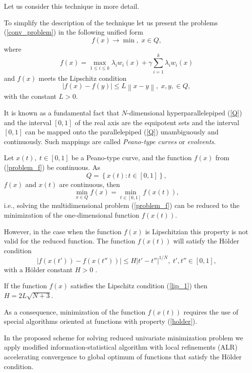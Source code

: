 \documentclass[]{interact}
\theoremstyle{plain}%
\theoremstyle{definition}
\theoremstyle{remark}
\begin{document}
Let us consider this technique in more detail.

To simplify the description of the technique let us present the problems (\ref{conv_problem}) in the following unified form
\begin{equation}\label{problem_f}
f(x) \rightarrow \min, \; x \in Q,
\end{equation}
where 
\[
f(x) = \max_{1 \leq i \leq k}{\lambda_i w_i(x)} + \gamma \sum_{i=1}^k{\lambda_i w_i(x)}
\]
and $f(x)$ meets the Lipschitz condition 
\begin{equation}\label{lip_1}
\left| f(x) - f(y)\right| \leq L \left\| x-y \right\|, \; x,y, \in Q,
\end{equation}
with the constant $L>0$.

It is known as a fundamental fact that $N$-dimensional hyperparallelepiped (\ref{Q}) and the interval $[0,1]$ of the real axis are the equipotent sets and the interval $[0,1]$ can be mapped onto the parallelepiped (\ref{Q}) unambiguously and continuously. Such mappings are called \textit{Peano-type curves} or \textit{evolvents}.


Let $x(t), \; t \in [0,1]$  be a Peano-type curve, and the function  $f(x)$ from (\ref{problem_f}) be continuous. As
\[
Q =\left\{x(t) : t \in [0,1]\right\},
\]
$f(x)$ and $x(t)$ are continuous, then
\[
\min_{x \in Q} f(x) = \min_{t \in [0,1]}f(x(t)),
\]
i.e., solving the multidimensional problem (\ref{problem_f}) can be reduced to the minimization of the one-dimensional function $f(x(t))$.

However, in the case when the function $f(x)$ is Lipschitzian this property is not valid for the reduced function. The function $f(x(t))$ will satisfy the H{\"o}lder condition
\begin{equation}\label{holder}
\left|f(x(t'))-f(x(t''))\right| \leq H \left|t'-t''\right|^{1/N}, \; t',t'' \in [0,1],
\end{equation}
with a H{\"o}lder constant $H>0$ \cite{Strongin2000,Sergeyev2013}.

If the function $f(x)$ satisfies the Lipschitz condition (\ref{lip_1}) then $H=2L\sqrt{N+3}$.

As a consequence, minimization of the function $f(x(t))$  requires the use of special algorithms oriented at functions with property (\ref{holder}).

In the proposed scheme for solving reduced univariate minimization problem we apply modified information-statistical algorithm \cite{Strongin2000} with local refinements (ALR) accelerating convergence to global optimum of functions that satisfy the H{\"o}lder condition.
\end{document}
